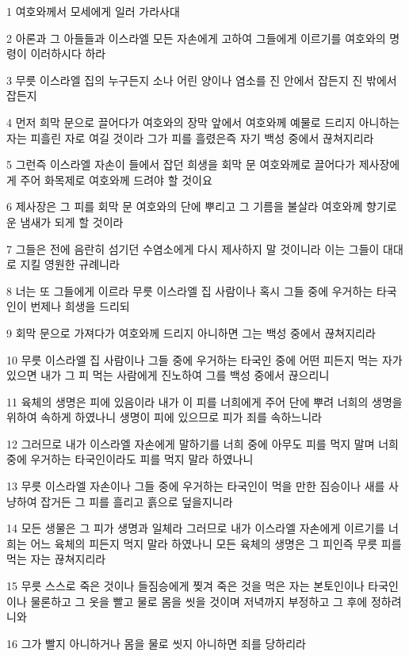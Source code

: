 \par 1 여호와께서 모세에게 일러 가라사대
\par 2 아론과 그 아들들과 이스라엘 모든 자손에게 고하여 그들에게 이르기를 여호와의 명령이 이러하시다 하라
\par 3 무릇 이스라엘 집의 누구든지 소나 어린 양이나 염소를 진 안에서 잡든지 진 밖에서 잡든지
\par 4 먼저 희막 문으로 끌어다가 여호와의 장막 앞에서 여호와께 예물로 드리지 아니하는 자는 피흘린 자로 여길 것이라 그가 피를 흘렸은즉 자기 백성 중에서 끊쳐지리라
\par 5 그런즉 이스라엘 자손이 들에서 잡던 희생을 회막 문 여호와께로 끌어다가 제사장에게 주어 화목제로 여호와께 드려야 할 것이요
\par 6 제사장은 그 피를 회막 문 여호와의 단에 뿌리고 그 기름을 불살라 여호와께 향기로운 냄새가 되게 할 것이라
\par 7 그들은 전에 음란히 섬기던 수염소에게 다시 제사하지 말 것이니라 이는 그들이 대대로 지킬 영원한 규례니라
\par 8 너는 또 그들에게 이르라 무릇 이스라엘 집 사람이나 혹시 그들 중에 우거하는 타국인이 번제나 희생을 드리되
\par 9 회막 문으로 가져다가 여호와께 드리지 아니하면 그는 백성 중에서 끊쳐지리라
\par 10 무릇 이스라엘 집 사람이나 그들 중에 우거하는 타국인 중에 어떤 피든지 먹는 자가 있으면 내가 그 피 먹는 사람에게 진노하여 그를 백성 중에서 끊으리니
\par 11 육체의 생명은 피에 있음이라 내가 이 피를 너희에게 주어 단에 뿌려 너희의 생명을 위하여 속하게 하였나니 생명이 피에 있으므로 피가 죄를 속하느니라
\par 12 그러므로 내가 이스라엘 자손에게 말하기를 너희 중에 아무도 피를 먹지 말며 너희 중에 우거하는 타국인이라도 피를 먹지 말라 하였나니
\par 13 무릇 이스라엘 자손이나 그들 중에 우거하는 타국인이 먹을 만한 짐승이나 새를 사냥하여 잡거든 그 피를 흘리고 흙으로 덮을지니라
\par 14 모든 생물은 그 피가 생명과 일체라 그러므로 내가 이스라엘 자손에게 이르기를 너희는 어느 육체의 피든지 먹지 말라 하였나니 모든 육체의 생명은 그 피인즉 무릇 피를 먹는 자는 끊쳐지리라
\par 15 무릇 스스로 죽은 것이나 들짐승에게 찢겨 죽은 것을 먹은 자는 본토인이나 타국인이나 물론하고 그 옷을 빨고 물로 몸을 씻을 것이며 저녁까지 부정하고 그 후에 정하려니와
\par 16 그가 빨지 아니하거나 몸을 물로 씻지 아니하면 죄를 당하리라

